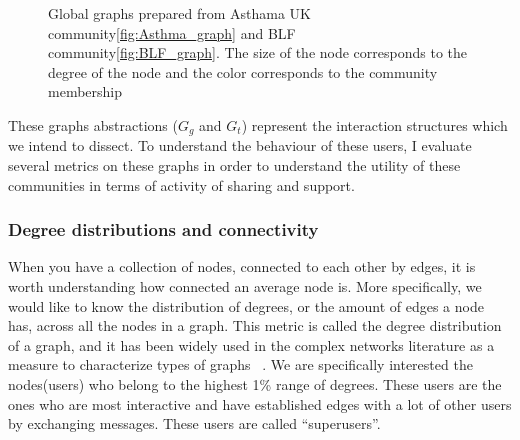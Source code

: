 \begin{figure}[!ht]
    \centering
    \caption{Global graphs prepared from Asthama UK community\ref{fig:Asthma_graph} and BLF community\ref{fig:BLF_graph}. The size of the node corresponds to the degree of the node and the color corresponds to the community membership }
\end{figure}

These graphs abstractions ($G_g$ and $G_t$) represent the interaction structures which we intend to dissect. To understand the behaviour of these users, I evaluate several metrics on these graphs in order to understand the utility of these communities in terms of activity of sharing and support.

\subsubsection{Degree distributions and connectivity}
When you have a collection of nodes, connected to each other by edges, it is worth understanding how connected an average node is. More specifically, we would like to know the distribution of degrees, or the amount of edges a node has, across all the nodes in a graph. This metric is called the degree distribution of a graph, and it has been widely used in the complex networks literature as a measure to characterize types of graphs ~\cite{muchnik2013origins,ahn2007analysis,leskovec2008microscopic,raman2019challenges}.
We are specifically interested the nodes(users) who belong to the highest 1\% range of degrees. These users are the ones who are most interactive and have established edges with a lot of other users by exchanging messages. These users are called ``superusers''. 


